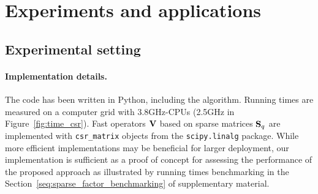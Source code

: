 

\section{Experiments and applications}
\label{sec:uses}

\subsection{Experimental setting}
\label{sec:uses:settings}

\paragraph{Implementation details.}
The code has been written in Python, including the \palm algorithm.
Running times are measured on a computer grid with 3.8GHz-CPUs (2.5GHz in Figure~\ref{fig:time_csr}).
Fast operators ${\mathbf{V}}$ based on sparse matrices ${\mathbf{S}}_q$ are implemented with \texttt{csr\_matrix} objects from the \texttt{scipy.linalg} package. 
While more efficient implementations may be beneficial for larger deployment, our implementation is sufficient as a proof of concept for assessing the performance of the proposed approach as illustrated by running times benchmarking in the Section~\ref{seq:sparse_factor_benchmarking} of supplementary material.





